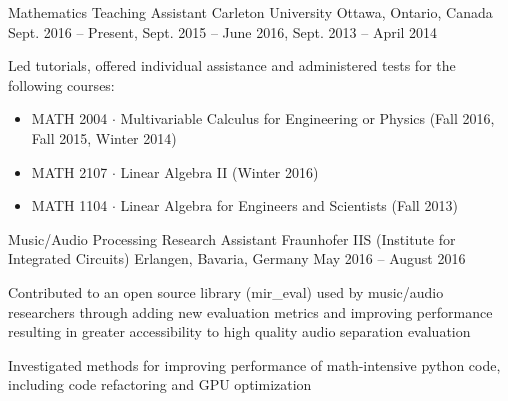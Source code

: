 

\begin{cventries}

    \cventry
      {Mathematics Teaching Assistant} %
      {Carleton University} %
      {Ottawa, Ontario, Canada} %
      {Sept. 2016 – Present, Sept. 2015 – June 2016, Sept. 2013 – April 2014} %
      {
        \begin{cvitems} %
          \item {Led tutorials, offered individual assistance and administered tests for the following courses:}
            \begin{itemize}
              \item {MATH 2004 $\cdot$ Multivariable Calculus for Engineering or Physics (Fall 2016, Fall 2015, Winter 2014)}
              \item {MATH 2107 $\cdot$ Linear Algebra II (Winter 2016)}
              \item {MATH 1104 $\cdot$ Linear Algebra for Engineers and Scientists (Fall 2013)}
            \end{itemize}
        \end{cvitems}
      }

  \cventry
    {Music/Audio Processing Research Assistant} %
    {Fraunhofer IIS (Institute for Integrated Circuits)} %
    {Erlangen, Bavaria, Germany} %
    {May 2016 – August 2016} %
    {
      \begin{cvitems} %
        \item {Contributed to an open source library (mir\_eval) used by music/audio researchers through adding new evaluation metrics and improving performance resulting in greater accessibility to high quality audio separation evaluation}
        \item {Investigated methods for improving performance of math-intensive python code, including code refactoring and GPU optimization}
      \end{cvitems}
    }


\end{cventries}
